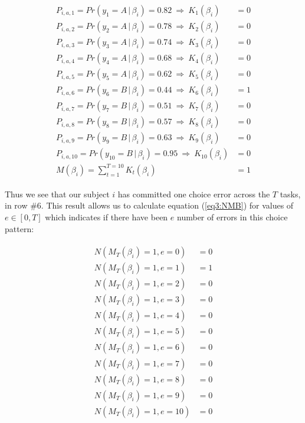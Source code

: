 \documentclass[../main.tex]{subfiles}
\begin{document}
\begin{align}
	\label{eq3:example_MTBn}
	\begin{split}
		P_{i,a,1}  = Pr(y_1 = A    \,|\, \beta_i) = 0.82 ~ \Rightarrow ~ K_{1}(\beta_i)  &= 0 \\
		P_{i,a,2}  = Pr(y_2 = A    \,|\, \beta_i) = 0.78 ~ \Rightarrow ~ K_{2}(\beta_i)  &= 0 \\
		P_{i,a,3}  = Pr(y_3 = A    \,|\, \beta_i) = 0.74 ~ \Rightarrow ~ K_{3}(\beta_i)  &= 0 \\
		P_{i,a,4}  = Pr(y_4 = A    \,|\, \beta_i) = 0.68 ~ \Rightarrow ~ K_{4}(\beta_i)  &= 0 \\
		P_{i,a,5}  = Pr(y_5 = A    \,|\, \beta_i) = 0.62 ~ \Rightarrow ~ K_{5}(\beta_i)  &= 0 \\
		P_{i,a,6}  = Pr(y_6 = B    \,|\, \beta_i) = 0.44 ~ \Rightarrow ~ K_{6}(\beta_i)  &= 1 \\
		P_{i,a,7}  = Pr(y_7 = B    \,|\, \beta_i) = 0.51 ~ \Rightarrow ~ K_{7}(\beta_i)  &= 0 \\
		P_{i,a,8}  = Pr(y_8 = B    \,|\, \beta_i) = 0.57 ~ \Rightarrow ~ K_{8}(\beta_i)  &= 0 \\
		P_{i,a,9}  = Pr(y_9 = B    \,|\, \beta_i) = 0.63 ~ \Rightarrow ~ K_{9}(\beta_i)  &= 0 \\
		P_{i,a,10} = Pr(y_{10} = B \,|\, \beta_i) = 0.95 ~ \Rightarrow ~ K_{10}(\beta_i) &= 0 \\
		                                M(\beta_i) = \sum_{t = 1}^{T = 10}{K_t(\beta_i)} &= 1
	\end{split}
\end{align}

\noindent Thus we see that our subject $i$ has committed one choice error across the $T$ tasks, in row \#6.
This result allows us to calculate equation (\ref{eq3:NMB}) for values of $e \in [ 0, T ]$ which indicates if there have been $e$ number of errors in this choice pattern:

\begin{align}
	\label{eq3:example_NMB}
	\begin{split}
		N( M_T(\beta_i) = 1, e = 0 )  &= 0 \\
		N( M_T(\beta_i) = 1, e = 1 )  &= 1 \\
		N( M_T(\beta_i) = 1, e = 2 )  &= 0 \\
		N( M_T(\beta_i) = 1, e = 3 )  &= 0 \\
		N( M_T(\beta_i) = 1, e = 4 )  &= 0 \\
		N( M_T(\beta_i) = 1, e = 5 )  &= 0 \\
		N( M_T(\beta_i) = 1, e = 6 )  &= 0 \\
		N( M_T(\beta_i) = 1, e = 7 )  &= 0 \\
		N( M_T(\beta_i) = 1, e = 8 )  &= 0 \\
		N( M_T(\beta_i) = 1, e = 9 )  &= 0 \\
		N( M_T(\beta_i) = 1, e = 10 ) &= 0 \\
	\end{split}
\end{align}
\end{document}
